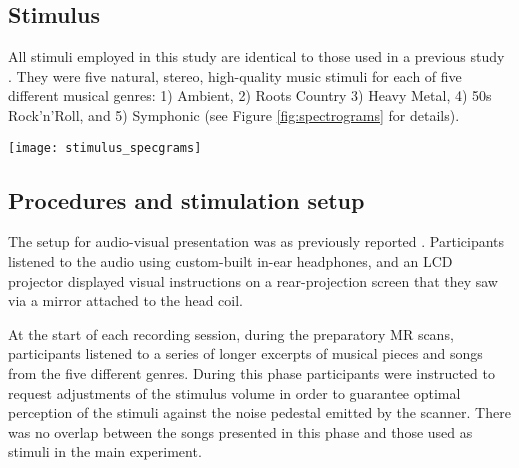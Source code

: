 \subsection*{Stimulus}

All stimuli employed in this study are identical to those used in a previous
study \cite[for details refer to][]{CTK+2012}. They were five natural,
stereo, high-quality music stimuli for each of five different musical genres:
1) Ambient, 2) Roots Country 3) Heavy Metal, 4) 50s Rock'n'Roll, and 5)
Symphonic (see Figure \ref{fig:spectrograms} for details).


\begin{figure*}
  \centering
  \texttt{[image: stimulus\_specgrams]}\\

  \caption{
    Spectrograms for all 25 stimuli showing structural differences in the
    time-frequency characteristics of the five musical genres.  Each stimulus
    was a six second excerpt from the middle of a distinct musical piece.
    Excerpts were normalized so that their root-mean-square power values were
    equal, and a \unit[50]{ms} quarter-sine ramp was applied at the start and
    end of each excerpt to suppress transients.  Most prominent are the
    differences between music clips with and without vocal components.
  }

  \label{fig:spectrograms}
\end{figure*}


\subsection*{Procedures and stimulation setup}

The setup for audio-visual presentation was as previously reported
\cite{HBI+14}. Participants listened to the audio using custom-built in-ear
headphones, and an LCD projector displayed visual instructions on a
rear-projection screen that they saw via a mirror attached to the head coil.

At the start of each recording session, during the preparatory MR scans,
participants listened to a series of longer excerpts of musical pieces and
songs from the five different genres. During this phase participants were
instructed to request adjustments of the stimulus volume in order to guarantee
optimal perception of the stimuli against the noise pedestal emitted by the
scanner. There was no overlap between the songs presented in this phase and those
used as stimuli in the main experiment.

